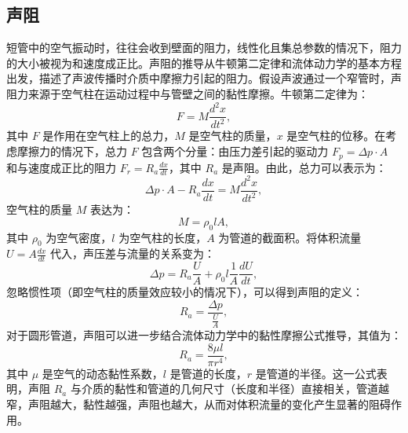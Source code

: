 \subsection{声阻}
短管中的空气振动时，往往会收到壁面的阻力，线性化且集总参数的情况下，阻力的大小被视为和速度成正比。声阻的推导从牛顿第二定律和流体动力学的基本方程出发，描述了声波传播时介质中摩擦力引起的阻力。假设声波通过一个窄管时，声阻力来源于空气柱在运动过程中与管壁之间的黏性摩擦。牛顿第二定律为：
\begin{equation} \label{eq2-19}
  F = M \frac{d^2 x}{dt^2},
\end{equation}
其中 \( F \) 是作用在空气柱上的总力，\( M \) 是空气柱的质量，\( x \) 是空气柱的位移。在考虑摩擦力的情况下，总力 \( F \) 包含两个分量：由压力差引起的驱动力 \( F_p = \Delta p \cdot A \) 和与速度成正比的阻力 \( F_r = R_a \frac{dx}{dt} \)，其中 \( R_a \) 是声阻。由此，总力可以表示为：
\begin{equation} \label{eq2-20}
  \Delta p \cdot A - R_a \frac{dx}{dt} = M \frac{d^2 x}{dt^2},
\end{equation}
空气柱的质量 \( M \) 表达为：
\begin{equation} \label{eq2-21}
  M = \rho_0 l A,
\end{equation}
其中 \( \rho_0 \) 为空气密度，\( l \) 为空气柱的长度，\( A \) 为管道的截面积。将体积流量 \( U = A \frac{dx}{dt} \) 代入，声压差与流量的关系变为：
\begin{equation} \label{eq2-22}
  \Delta p = R_a \frac{U}{A} + \rho_0 l \frac{1}{A} \frac{dU}{dt},
\end{equation}
忽略惯性项（即空气柱的质量效应较小的情况下），可以得到声阻的定义：
\begin{equation} \label{eq2-23}
  R_a = \frac{\Delta p}{\frac{U}{A}},
\end{equation}
对于圆形管道，声阻可以进一步结合流体动力学中的黏性摩擦公式推导，其值为：
\begin{equation} \label{eq2-24}
  R_a = \frac{8 \mu l}{\pi r^4},
\end{equation}
其中 \( \mu \) 是空气的动态黏性系数，\( l \) 是管道的长度，\( r \) 是管道的半径。这一公式表明，声阻 \( R_a \) 与介质的黏性和管道的几何尺寸（长度和半径）直接相关，管道越窄，声阻越大，黏性越强，声阻也越大，从而对体积流量的变化产生显著的阻碍作用。





